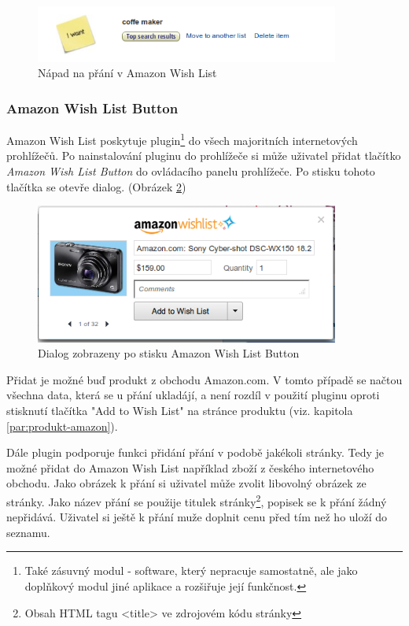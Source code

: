 \begin{figure}[htb]
\begin{center}
\includegraphics[width=100mm]{./pictures/amazon-wishlist-idea.png}
\caption{Nápad na přání v Amazon Wish List}
\label{fig:amazon-wishlist-idea}
\end{center}
\end{figure}

\subsubsection{Amazon Wish List Button}
\label{sec:amazon-wishlist-button}
Amazon Wish List poskytuje plugin\footnote{Také zásuvný modul - software, který nepracuje samostatně, ale jako doplňkový modul jiné aplikace a rozšiřuje její funkčnost.} do všech majoritních internetových prohlížečů\cite{website:amazon:plugin}. Po nainstalování pluginu do prohlížeče si může uživatel přidat tlačítko \emph{Amazon Wish List Button} do ovládacího panelu prohlížeče. Po stisku tohoto tlačítka se otevře dialog. (Obrázek \ref{fig:amazon-wishlist-plugin})

\begin{figure}[htb]
\begin{center}
\includegraphics[width=100mm]{./pictures/amazon-wishlist-plugin.png}
\caption{Dialog zobrazeny po stisku Amazon Wish List Button}
\label{fig:amazon-wishlist-plugin}
\end{center}
\end{figure}

Přidat je možné buď produkt z obchodu Amazon.com. V tomto případě se načtou všechna data, která se u přání ukladájí, a není rozdíl v použití pluginu oproti stisknutí tlačítka "Add to Wish List" na stránce produktu (viz. kapitola \ref{par:produkt-amazon}).

Dále plugin podporuje funkci přidání přání v podobě jakékoli stránky. Tedy je možné přidat do Amazon Wish List například zboží z českého internetového obchodu. Jako obrázek k přání si uživatel může zvolit libovolný obrázek ze stránky. Jako název přání se použije titulek stránky\footnote{Obsah HTML tagu <title> ve zdrojovém kódu stránky}, popisek se k přání žádný nepřidává. Uživatel si ještě k přání muže doplnit cenu před tím než ho uloží do seznamu.

